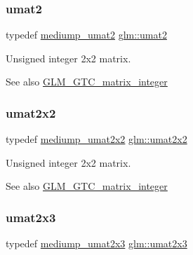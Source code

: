 \subsubsection{\texorpdfstring{umat2}{umat2}}
{\footnotesize\ttfamily typedef \mbox{\hyperlink{group__gtc__matrix__integer_gaafd6d236ce051d138e3fdf53de3813e6}{mediump\+\_\+umat2}} \mbox{\hyperlink{group__gtc__matrix__integer_gae2d45c058cfa0b60ab4df0cdda2d8516}{glm\+::umat2}}}

Unsigned integer 2x2 matrix. \begin{DoxySeeAlso}{See also}
\mbox{\hyperlink{group__gtc__matrix__integer}{G\+L\+M\+\_\+\+G\+T\+C\+\_\+matrix\+\_\+integer}} 
\end{DoxySeeAlso}
\mbox{\label{group__gtc__matrix__integer_gad3c997b31dd69bdb4787867e758ed48d}} 
\subsubsection{\texorpdfstring{umat2x2}{umat2x2}}
{\footnotesize\ttfamily typedef \mbox{\hyperlink{group__gtc__matrix__integer_ga539a528818569c17e68e77afce7755c2}{mediump\+\_\+umat2x2}} \mbox{\hyperlink{group__gtc__matrix__integer_gad3c997b31dd69bdb4787867e758ed48d}{glm\+::umat2x2}}}

Unsigned integer 2x2 matrix. \begin{DoxySeeAlso}{See also}
\mbox{\hyperlink{group__gtc__matrix__integer}{G\+L\+M\+\_\+\+G\+T\+C\+\_\+matrix\+\_\+integer}} 
\end{DoxySeeAlso}
\mbox{\label{group__gtc__matrix__integer_ga890ae28f9230794138b2c89f44ce3376}} 
\subsubsection{\texorpdfstring{umat2x3}{umat2x3}}
{\footnotesize\ttfamily typedef \mbox{\hyperlink{group__gtc__matrix__integer_ga15d2790e10b27b145cd748abffde8968}{mediump\+\_\+umat2x3}} \mbox{\hyperlink{group__gtc__matrix__integer_ga890ae28f9230794138b2c89f44ce3376}{glm\+::umat2x3}}}

